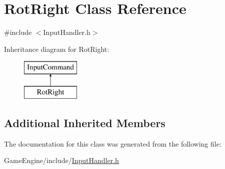 \hypertarget{class_rot_right}{}\section{Rot\+Right Class Reference}
\label{class_rot_right}


{\ttfamily \#include $<$Input\+Handler.\+h$>$}

Inheritance diagram for Rot\+Right\+:\begin{figure}[H]
\begin{center}
\leavevmode
\includegraphics[height=2.000000cm]{class_rot_right}
\end{center}
\end{figure}
\subsection*{Additional Inherited Members}


The documentation for this class was generated from the following file\+:\begin{DoxyCompactItemize}
\item 
Game\+Engine/include/\mbox{\hyperlink{_input_handler_8h}{Input\+Handler.\+h}}\end{DoxyCompactItemize}
